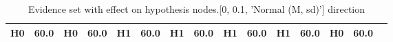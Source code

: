 \begin{table}
\begin{tabular}{c|cc|cc|cc|cc|cc|cc|cc}
\cellcolor{Bittersweet}H0&\cellcolor{Bittersweet}60.0&\cellcolor{Bittersweet}H0&\cellcolor{Bittersweet}60.0&\cellcolor{Bittersweet}H1&\cellcolor{Bittersweet}60.0&\cellcolor{Bittersweet}H1&\cellcolor{Bittersweet}60.0&\cellcolor{Bittersweet}H1&\cellcolor{Bittersweet}60.0&\cellcolor{Bittersweet}H1&\cellcolor{Bittersweet}60.0&\cellcolor{Bittersweet}H0&\cellcolor{Bittersweet}60.0\\\bottomrule\end{tabular}\caption{Evidence set with effect on hypothesis nodes.[0, 0.1, 'Normal (M, sd)'] direction}\end{table}